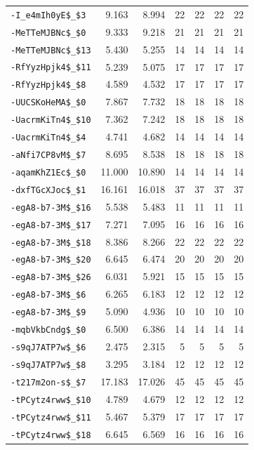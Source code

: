 \begin{longtable}{lrrrrrr}
\nolinkurl{-I_e4mIh0yE$_$3} & 9.163 & 8.994 & 22 & 22 & 22 & 22\\
\nolinkurl{-MeTTeMJBNc$_$0} & 9.333 & 9.218 & 21 & 21 & 21 & 21\\
\nolinkurl{-MeTTeMJBNc$_$13} & 5.430 & 5.255 & 14 & 14 & 14 & 14\\
\nolinkurl{-RfYyzHpjk4$_$11} & 5.239 & 5.075 & 17 & 17 & 17 & 17\\
\nolinkurl{-RfYyzHpjk4$_$8} & 4.589 & 4.532 & 17 & 17 & 17 & 17\\
\nolinkurl{-UUCSKoHeMA$_$0} & 7.867 & 7.732 & 18 & 18 & 18 & 18\\
\nolinkurl{-UacrmKiTn4$_$10} & 7.362 & 7.242 & 18 & 18 & 18 & 18\\
\nolinkurl{-UacrmKiTn4$_$4} & 4.741 & 4.682 & 14 & 14 & 14 & 14\\
\nolinkurl{-aNfi7CP8vM$_$7} & 8.695 & 8.538 & 18 & 18 & 18 & 18\\
\nolinkurl{-aqamKhZ1Ec$_$0} & 11.000 & 10.890 & 14 & 14 & 14 & 14\\
\nolinkurl{-dxfTGcXJoc$_$1} & 16.161 & 16.018 & 37 & 37 & 37 & 37\\
\nolinkurl{-egA8-b7-3M$_$16} & 5.538 & 5.483 & 11 & 11 & 11 & 11\\
\nolinkurl{-egA8-b7-3M$_$17} & 7.271 & 7.095 & 16 & 16 & 16 & 16\\
\nolinkurl{-egA8-b7-3M$_$18} & 8.386 & 8.266 & 22 & 22 & 22 & 22\\
\nolinkurl{-egA8-b7-3M$_$20} & 6.645 & 6.474 & 20 & 20 & 20 & 20\\
\nolinkurl{-egA8-b7-3M$_$26} & 6.031 & 5.921 & 15 & 15 & 15 & 15\\
\nolinkurl{-egA8-b7-3M$_$6} & 6.265 & 6.183 & 12 & 12 & 12 & 12\\
\nolinkurl{-egA8-b7-3M$_$9} & 5.090 & 4.936 & 10 & 10 & 10 & 10\\
\nolinkurl{-mqbVkbCndg$_$0} & 6.500 & 6.386 & 14 & 14 & 14 & 14\\
\nolinkurl{-s9qJ7ATP7w$_$6} & 2.475 & 2.315 & 5 & 5 & 5 & 5\\
\nolinkurl{-s9qJ7ATP7w$_$8} & 3.295 & 3.184 & 12 & 12 & 12 & 12\\
\nolinkurl{-t217m2on-s$_$7} & 17.183 & 17.026 & 45 & 45 & 45 & 45\\
\nolinkurl{-tPCytz4rww$_$10} & 4.789 & 4.679 & 12 & 12 & 12 & 12\\
\nolinkurl{-tPCytz4rww$_$11} & 5.467 & 5.379 & 17 & 17 & 17 & 17\\
\nolinkurl{-tPCytz4rww$_$18} & 6.645 & 6.569 & 16 & 16 & 16 & 16\\

\end{longtable}
